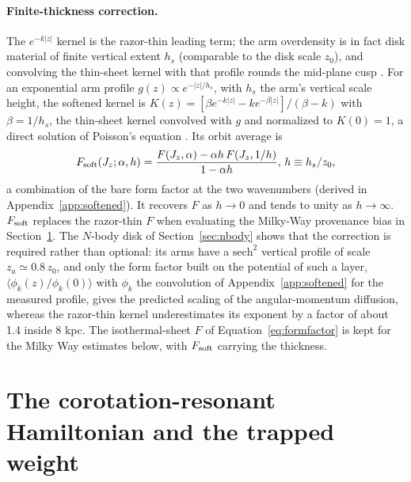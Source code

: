 \documentclass[twocolumn]{aastex701}
\newcommand{\Jz}{J_z}
\begin{document}
\paragraph{Finite-thickness correction.} The $e^{-k|z|}$ kernel is the razor-thin
leading term; the arm overdensity is in fact disk material of finite vertical extent
$h_s$ (comparable to the disk scale $z_0$), and convolving the thin-sheet kernel with
that profile rounds the mid-plane cusp \citep{Toomre1964}. For an exponential arm
profile $g(z)\propto e^{-|z|/h_s}$, with $h_s$ the arm's vertical scale height, the
softened kernel is $K(z)=[\beta e^{-k|z|}-k e^{-\beta|z|}]/(\beta-k)$ with
$\beta=1/h_s$, the thin-sheet kernel convolved with $g$ and normalized to $K(0)=1$,
a direct solution of Poisson's equation \citep{BinneyTremaine2008}. Its orbit average
is
%
\begin{equation}
  F_{\rm soft}(\Jz;\alpha,h)=\frac{F(\Jz,\alpha)-\alpha h\,F(\Jz,1/h)}{1-\alpha h},
  \, h\equiv h_s/z_0,
  \label{eq:softened}
\end{equation}
%
a combination of the bare form factor at the two wavenumbers (derived in
Appendix~\ref{app:softened}). It recovers $F$ as
$h\to0$ and tends to unity as $h\to\infty$. $F_{\rm soft}$ replaces the razor-thin $F$ when evaluating the Milky-Way
provenance bias in Section~\ref{sec:trapping}. The $N$-body disk of
Section~\ref{sec:nbody} shows that the correction is required rather than optional:
its arms have a $\mathrm{sech}^2$ vertical profile of scale $z_a\simeq0.8\,z_0$, and
only the form factor built on the potential of such a layer,
$\langle\phi_k(z)/\phi_k(0)\rangle$ with $\phi_k$ the convolution of
Appendix~\ref{app:softened} for the measured profile, gives the predicted scaling of
the angular-momentum diffusion, whereas the razor-thin kernel underestimates its
exponent by a factor of about 1.4 inside 8 kpc. The isothermal-sheet $F$ of
Equation~\eqref{eq:formfactor} is kept for the Milky Way estimates below, with
$F_{\rm soft}$ carrying the thickness.

\section{The corotation-resonant Hamiltonian and the trapped weight}
\label{sec:trapping}
\end{document}
